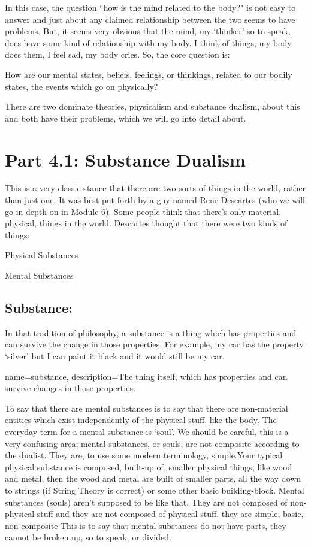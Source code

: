 In this case, the question ``how is the mind related to the body?" is not easy to answer and just about any claimed relationship between the two seems to have problems. But, it seems very obvious that the mind, my `thinker' so to speak, does have some kind of relationship with my body. I think of things, my body does them, I feel sad, my body cries. So, the core question is:

\begin{center}How are our mental states, beliefs, feelings, or thinkings, related to our bodily states, the events which go on physically?\end{center}

There are two dominate theories, \gls{physicalism} and \gls{substance dualism}, about this and both have their problems, which we will go into detail about.

\section{Part 4.1: Substance Dualism}

This is a very classic stance that there are two sorts of things in the world, rather than just one. It was best put forth by a guy named Rene Descartes (who we will go in depth on in Module 6). Some people think that there’s only material, physical, things in the world. Descartes thought that there were two kinds of things:
\begin{earg}
    \item[]Physical Substances
    \item[]Mental Substances
\end{earg}
\subsection{Substance:}

In that tradition of philosophy, a \gls{substance} is a thing which has properties and can survive the change in those properties. For example, my car has the property ‘silver’ but I can paint it black and it would still be my car.

{
name=substance,
description={The thing itself, which has properties and can survive changes in those properties.}
}


To say that there are mental substances is to say that there are non-material entities which exist independently of the physical stuff, like the body. The everyday term for a mental substance is `soul'. We should be careful, this is a very confusing area; mental substances, or souls, are not composite according to the dualist. They are, to use some modern terminology, simple.Your typical physical substance is composed, built-up of, smaller physical things, like wood and metal, then the wood and metal are built of smaller parts, all the way down to strings (if String Theory is correct) or some other basic building-block. Mental substances (souls) aren't supposed to be like that. They are not composed of non-physical stuff and they are not composed of physical stuff, they are simple, basic, non-composite This is to say that mental substances do not have parts, they cannot be broken up, so to speak, or divided. 

